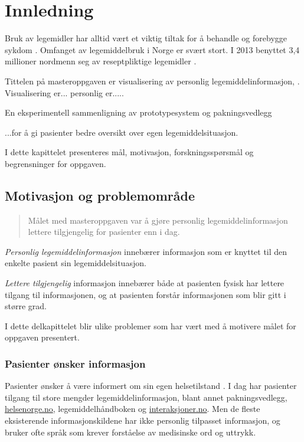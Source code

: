 \chapter{Innledning} \label{chap:innledning}

Bruk av legemidler har alltid vært et viktig tiltak for å behandle og forebygge sykdom \citep{IllustrertFarmakologi}. Omfanget av legemiddelbruk i Norge er svært stort. I 2013 benyttet  3,4 millioner nordmenn seg av reseptpliktige legemidler \citep{TallOgFakta2013}.

Tittelen på masteroppgaven er visualisering av personlig legemiddelinformasjon, . Visualisering er... personlig er..... 

En eksperimentell sammenligning av prototypesystem og
pakningsvedlegg


...for å gi pasienter bedre oversikt over egen legemiddelsituasjon.

I dette kapittelet presenteres mål, motivasjon, forskningsspørsmål og begrensninger for oppgaven.

\section{Motivasjon og problemområde} \label{sec:forskningsmaal}

\begin{quote}Målet med masteroppgaven var å gjøre personlig legemiddelinformasjon lettere tilgjengelig for pasienter enn i dag.\end{quote}

\textit{Personlig legemiddelinformasjon} innebærer informasjon som er knyttet til den enkelte pasient sin legemiddelsituasjon. 

\textit{Lettere tilgjengelig} informasjon innebærer både at pasienten fysisk har lettere tilgang til informasjonen, og at pasienten forstår informasjonen som blir gitt i større grad. 

I dette delkapittelet blir ulike problemer som har vært med å motivere målet for oppgaven presentert. 

\subsection*{Pasienter ønsker informasjon}
Pasienter ønsker å være informert om sin egen helsetilstand \citep{CancerPatients}. I dag har pasienter tilgang til store mengder legemiddelinformasjon, blant annet pakningsvedlegg, \url{helsenorge.no}, legemiddelhåndboken og \url{interaksjoner.no}. Men de fleste eksisterende informasjonskildene har ikke personlig tilpasset informasjon, og bruker ofte språk som krever forståelse av medisinske ord og uttrykk. 

